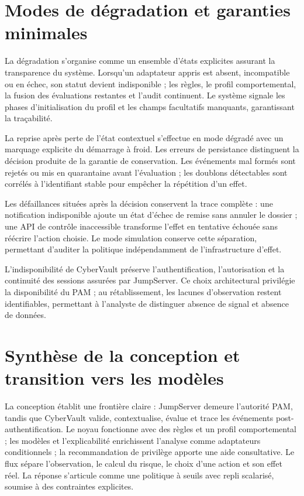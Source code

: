 \documentclass[11pt,a4paper,oneside]{report}
\theoremstyle{definition}
\theoremstyle{plain}
\begin{document}
\section{Modes de dégradation et garanties minimales}

La dégradation s'organise comme un ensemble d'états explicites assurant la
transparence du système. Lorsqu'un adaptateur appris est absent, incompatible
ou en échec, son statut devient indisponible ; les règles, le profil
comportemental, la fusion des évaluations restantes et l'audit continuent. Le
système signale les phases d'initialisation du profil et les champs facultatifs
manquants, garantissant la traçabilité.

La reprise après perte de l'état contextuel s'effectue en mode dégradé avec un
marquage explicite du démarrage à froid. Les erreurs de persistance distinguent
la décision produite de la garantie de conservation. Les événements mal formés
sont rejetés ou mis en quarantaine avant l'évaluation ; les doublons détectables
sont corrélés à l'identifiant stable pour empêcher la répétition d'un effet.

Les défaillances situées après la décision conservent la trace complète : une
notification indisponible ajoute un état d'échec de remise sans annuler le dossier ;
une API de contrôle inaccessible transforme l'effet en tentative échouée sans
réécrire l'action choisie. Le mode simulation conserve cette séparation, permettant
d'auditer la politique indépendamment de l'infrastructure d'effet.

L'indisponibilité de CyberVault préserve l'authentification, l'autorisation et
la continuité des sessions assurées par JumpServer. Ce choix architectural
privilégie la disponibilité du PAM ; au rétablissement, les lacunes
d'observation restent identifiables, permettant à l'analyste de distinguer
absence de signal et absence de données.

\section{Synthèse de la conception et transition vers les modèles}

La conception établit une frontière claire : JumpServer demeure l'autorité PAM,
tandis que CyberVault valide, contextualise, évalue et trace les événements
post-authentification. Le noyau fonctionne avec des règles et un profil
comportemental ; les modèles et l'explicabilité enrichissent l'analyse comme
adaptateurs conditionnels ; la recommandation de privilège apporte une aide
consultative. Le flux sépare l'observation, le calcul du risque, le choix
d'une action et son effet réel. La réponse s'articule comme une politique à
seuils avec repli scalarisé, soumise à des contraintes explicites.
\end{document}
